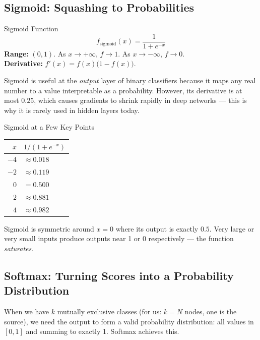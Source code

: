 \subsection{Sigmoid: Squashing to Probabilities}

\begin{mathbox}{Sigmoid Function}
\begin{equation}
    f_{\text{sigmoid}}(x) = \frac{1}{1 + e^{-x}}
\end{equation}
\textbf{Range:} $(0, 1)$. As $x \to +\infty$, $f \to 1$. As $x \to -\infty$, $f \to 0$.\\
\textbf{Derivative:} $f'(x) = f(x)\bigl(1 - f(x)\bigr)$.
\end{mathbox}

Sigmoid is useful at the \emph{output} layer of binary classifiers because it maps any real number to a value interpretable as a probability. However, its derivative is at most $0.25$, which causes gradients to shrink rapidly in deep networks --- this is why it is rarely used in hidden layers today.

\begin{examplebox}{Sigmoid at a Few Key Points}
\begin{center}
\renewcommand{\arraystretch}{1.3}
\begin{tabular}{rl}
\toprule
$x$ & $1/(1+e^{-x})$ \\
\midrule
$-4$ & $\approx 0.018$ \\
$-2$ & $\approx 0.119$ \\
$0$  & $= 0.500$ \\
$2$  & $\approx 0.881$ \\
$4$  & $\approx 0.982$ \\
\bottomrule
\end{tabular}
\end{center}
Sigmoid is symmetric around $x=0$ where its output is exactly $0.5$. Very large or very small inputs produce outputs near 1 or 0 respectively --- the function \emph{saturates}.
\end{examplebox}

\subsection{Softmax: Turning Scores into a Probability Distribution}

When we have $k$ mutually exclusive classes (for us: $k = N$ nodes, one is the source), we need the output to form a valid probability distribution: all values in $[0,1]$ and summing to exactly 1. Softmax achieves this.

